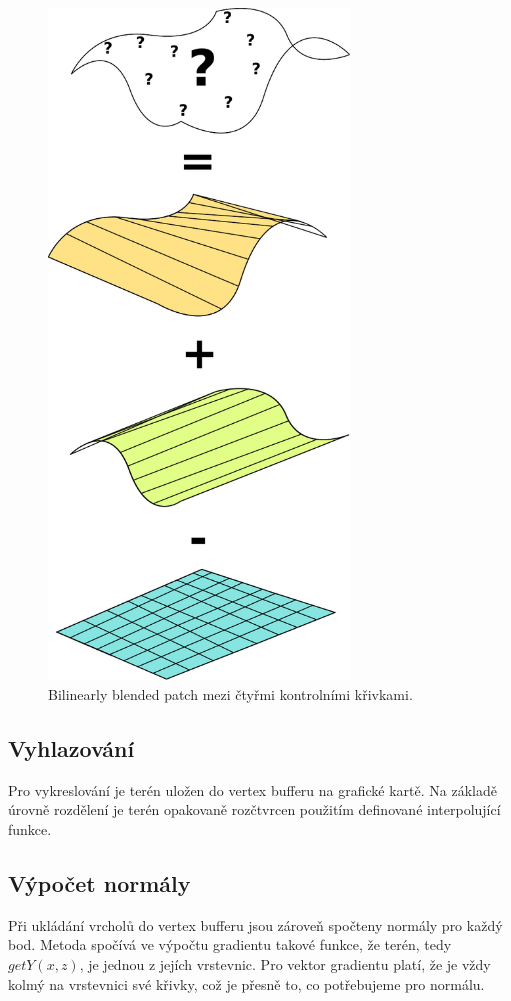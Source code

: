 \documentclass[11pt]{article}
\begin{document}
\begin{figure}[ht!]
\centering
	\includegraphics[width=8cm]{coons.pdf}
	\caption{Bilinearly blended patch mezi čtyřmi kontrolními křivkami.}
\end{figure}

\clearpage

\subsection{Vyhlazování}
Pro vykreslování je terén uložen do vertex bufferu na grafické kartě. Na
základě úrovně rozdělení je terén opakovaně rozčtvrcen použitím definované
interpolující funkce.

\subsection{Výpočet normály}
Při ukládání vrcholů do vertex bufferu jsou zároveň spočteny normály pro každý
bod. Metoda spočívá ve výpočtu gradientu takové funkce, že terén, tedy $getY(x,
z)$, je jednou z jejích vrstevnic. Pro vektor gradientu platí, že je vždy kolmý
na vrstevnici své křivky, což je přesně to, co potřebujeme pro normálu.
\end{document}
